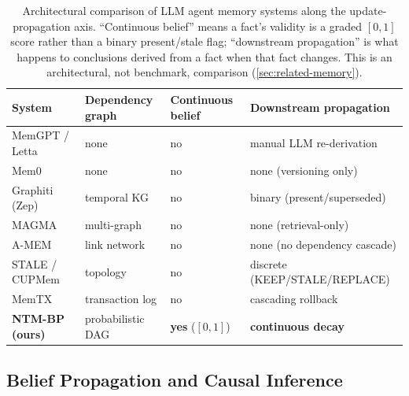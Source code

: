 \documentclass{article}
\theoremstyle{definition}
\begin{document}
\begin{table}[t]
\centering
\caption{Architectural comparison of LLM agent memory systems along the
  update-propagation axis.  ``Continuous belief'' means a fact's
  validity is a graded $[0,1]$ score rather than a binary
  present/stale flag; ``downstream propagation'' is what happens to
  conclusions derived from a fact when that fact changes.  This is an
  architectural, not benchmark, comparison (\cref{sec:related-memory}).}
\label{tab:system-compare}
\small
\begin{tabular}{@{}llll@{}}
\toprule
System & Dependency graph & Continuous belief & Downstream propagation \\
\midrule
MemGPT / Letta~\cite{memgpt,letta} & none & no & manual LLM re-derivation \\
Mem0~\cite{mem0}                   & none & no & none (versioning only) \\
Graphiti (Zep)~\cite{zep}          & temporal KG & no & binary (present/superseded) \\
MAGMA~\cite{magma2026}             & multi-graph & no & none (retrieval-only) \\
A-MEM~\cite{amem2026}              & link network & no & none (no dependency cascade) \\
STALE / CUPMem~\cite{stale2026}    & topology & no & discrete (KEEP/STALE/REPLACE) \\
MemTX~\cite{memtx2026}             & transaction log & no & cascading rollback \\
\midrule
\textbf{NTM-BP (ours)}             & probabilistic DAG & \textbf{yes} ($[0,1]$) & \textbf{continuous decay} \\
\bottomrule
\end{tabular}
\end{table}

\subsection{Belief Propagation and Causal Inference}
\end{document}
